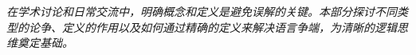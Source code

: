 \begin{logicbox}[title=第三部分：论争与定义]
\textit{在学术讨论和日常交流中，明确概念和定义是避免误解的关键。本部分探讨不同类型的论争、定义的作用以及如何通过精确的定义来解决语言争端，为清晰的逻辑思维奠定基础。}
\end{logicbox}